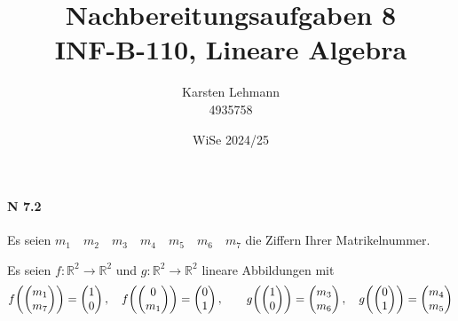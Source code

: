 \documentclass{scrreprt}
\author{Karsten Lehmann \\ 4935758}
\date{WiSe 2024/25}
\title{Nachbereitungsaufgaben 8\\INF-B-110, Lineare Algebra}
\begin{document}
\paragraph{N 7.2}
Es seien $m_1 \quad m_2 \quad m_3 \quad m_4 \quad m_5 \quad m_6 \quad m_7$ die
Ziffern Ihrer Matrikelnummer.

Es seien $f \colon \mathbb{R}^2 \to \mathbb{R}^2$ und
$g \colon \mathbb{R}^2 \to \mathbb{R}^2$ lineare Abbildungen mit
\[
  f\qty(\begin{pmatrix} m_1 \\ m_7 \end{pmatrix})
  = \begin{pmatrix} 1 \\ 0 \end{pmatrix}, \quad
  f\qty(\begin{pmatrix} 0 \\ m_1 \end{pmatrix})
  = \begin{pmatrix} 0 \\ 1 \end{pmatrix}, \qquad
  g\qty(\begin{pmatrix} 1 \\ 0 \end{pmatrix})
  = \begin{pmatrix} m_3 \\ m_6 \end{pmatrix}, \quad
  g\qty(\begin{pmatrix} 0 \\ 1 \end{pmatrix})
  = \begin{pmatrix} m_4 \\ m_5 \end{pmatrix}
\]
\end{document}
